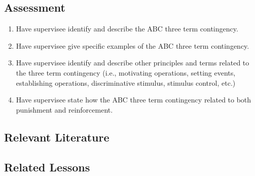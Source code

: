 \subsection{Assessment}
\begin{enumerate}
\item Have supervisee identify and describe the ABC three term contingency.
\item Have supervisee give specific examples of the ABC three term contingency.
\item Have supervisee identify and describe other principles and terms related to the three term contingency (i.e., motivating operations, setting events, establishing operations, discriminative stimulus, stimulus control, etc.)
\item Have supervisee state how the ABC three term contingency related to both punishment and reinforcement.
\end{enumerate}
%
\subsection{Relevant Literature}
\begin{refsection}
\nocite{azrin1966punishment,
        cooper2007applied,
        glenn1992revolutionary,
        michael2004concepts,
        moxley2004pragmatic,
        sulzer1977applying,
        vollmer2002punishment,
        vollmer1991establishing}
\printbibliography[heading=none]
\end{refsection}
%
\subsection{Related Lessons}
\fourbOne{}\\
\foureOne{}\\
\fourgFour{}\\
\fouriOne{}\\
\fouriTwo{}\\
\fourFKTen{}\\
\fourFKEleven{}\\
\fourFKFifteen{}\\
\fourFKTwentyOne{}\\
\fourFKTwentySeven{}\\
\fourFKThirty{}\\
\fourFKThirtyThree{}\\
\fourFKThirtyFour{}\\
\fourFKThirtyFive{}\\
\fourFKFourtyOne{}\\
